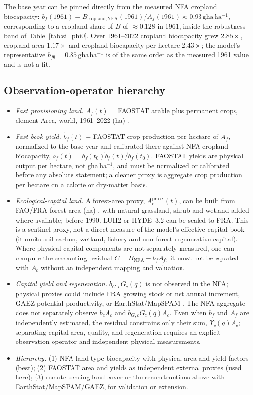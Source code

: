 \documentclass[11pt,a4paper]{article}
\newcommand{\Ups}{\Upsilon_c}
\begin{document}
The base year can be pinned directly from the measured NFA cropland biocapacity: $b_f(1961)=B_{\mathrm{cropland,NFA}}(1961)/A_f(1961)\approx0.93\,\mathrm{gha\,ha^{-1}}$, corresponding to a cropland share of $B$ of $\approx0.128$ in 1961, inside the robustness band of Table~\ref{tab:si_phi0}. Over 1961--2022 cropland biocapacity grew $2.85\times$, cropland area $1.17\times$ and cropland biocapacity per hectare $2.43\times$; the model's representative $b_{f0}=0.85\,\mathrm{gha\,ha^{-1}}$ is of the same order as the measured 1961 value and is not a fit.

\subsection{Observation-operator hierarchy}\label{si:operator}

\begin{itemize}[leftmargin=1.5em]
\item \emph{Fast provisioning land.} $A_f(t)$ = FAOSTAT arable plus permanent crops, element Area, world, 1961--2022 (ha) \citep{FAO2023}.
\item \emph{Fast-book yield.} $\tilde b_f(t)$ = FAOSTAT crop production per hectare of $A_f$, normalized to the base year and calibrated there against NFA cropland biocapacity, $b_f(t)=b_f(t_0)\tilde b_f(t)/\tilde b_f(t_0)$. FAOSTAT yields are physical output per hectare, not gha\,ha$^{-1}$, and must be normalized or calibrated before any absolute statement; a cleaner proxy is aggregate crop production per hectare on a calorie or dry-matter basis.
\item \emph{Ecological-capital land.} A forest-area proxy, $A_c^{\mathrm{proxy}}(t)$, can be built from FAO/FRA forest area (ha) \citep{FAO2020}, with natural grassland, shrub and wetland added where available; before 1990, LUH2 \citep{Hurtt2011} or HYDE~3.2 \citep{KleinGoldewijk2017} can be scaled to FRA. This is a sentinel proxy, not a direct measure of the model's effective capital book (it omits soil carbon, wetland, fishery and non-forest regenerative capital). Where physical capital components are not separately measured, one can compute the accounting residual $C=B_{\mathrm{NFA}}-b_fA_f$; it must not be equated with $A_c$ without an independent mapping and valuation.
\item \emph{Capital yield and regeneration.} $b_{G,c}G_c(q)$ is not observed in the NFA; physical proxies could include FRA growing stock or net annual increment, GAEZ potential productivity, or EarthStat/MapSPAM \citep{Monfreda2008}. The NFA aggregate does not separately observe $b_cA_c$ and $b_{G,c}G_c(q)A_c$. Even when $b_f$ and $A_f$ are independently estimated, the residual constrains only their sum, $\Ups(q)A_c$; separating capital area, quality, and regeneration requires an explicit observation operator and independent physical measurements.
\item \emph{Hierarchy.} (1) NFA land-type biocapacity with physical area and yield factors (best); (2) FAOSTAT area and yields as independent external proxies (used here); (3) remote-sensing land cover \citep{ESA2017,Copernicus2019} or the reconstructions above with EarthStat/MapSPAM/GAEZ, for validation or extension.
\end{itemize}
\end{document}
